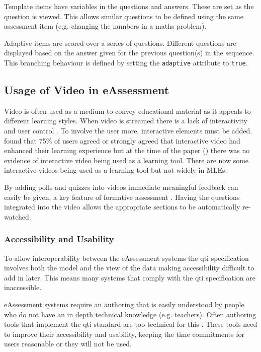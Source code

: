 Template items have variables in the questions and answers. These are set as the question is viewed. This allows similar questions to be defined using the same assessment item (e.g. changing the numbers in a maths problem).

Adaptive items are scored over a series of questions. Different questions are displayed based on the answer given for the previous question(s) in the sequence. This branching behaviour is defined by setting the \lstinline!adaptive! attribute to \lstinline!true!. 

\subsection{Usage of Video in eAssessment}
\label{Subsection:Usage of Video in eAssessment}
Video is often used as a medium to convey educational material as it appeals to different learning styles. When video is streamed there is a lack of interactivity and user control \citep{eps267281, DeBoer}. To involve the user more, interactive elements must be added.  found that 75\% of users agreed or strongly agreed that interactive video had enhanced their learning experience but at the time of the paper (\citeyear{eps267281}) there was no evidence of interactive video being used as a learning tool. There are now some interactive videos being used as a learning tool \citep{nadia} but not widely in \glspl{MLE}.

By adding polls and quizzes into videos immediate meaningful feedback can easily be given, a key feature of formative assessment \citep{eps265979}. Having the questions integrated into the video allows the appropriate sections to be automatically re-watched. 
\subsubsection{Accessibility and Usability}
\label{Subsubsection:Accessibility and Usability}
To allow interoperability between the \gls{eAssessment} systems the \gls{qti} specification involves both the model and the view of the data \citep{wikieassessment} making accessibility difficult to add in later. This means many systems that comply with the \gls{qti} specification are inaccessible.

\gls{eAssessment} systems require an \gls{authoring} that is easily understood by people who do not have an in depth technical knowledge (e.g. teachers). Often authoring tools that implement the \gls{qti} standard are too technical for this \citep{wikieassessment}. These tools need to improve their accessibility and usability, keeping the time commitments for users reasonable \citep{eps271236, eps265979} or they will not be used.

